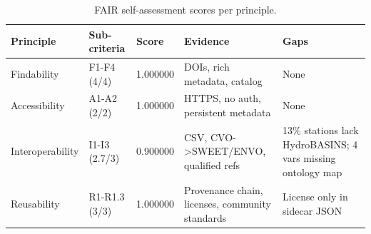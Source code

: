 \begin{table}
\caption{FAIR self-assessment scores per principle.}
\label{tab:fair}
\begin{tabular}{lllll}
\toprule
Principle & Sub-criteria & Score & Evidence & Gaps \\
\midrule
Findability & F1-F4 (4/4) & 1.000000 & DOIs, rich metadata, catalog & None \\
Accessibility & A1-A2 (2/2) & 1.000000 & HTTPS, no auth, persistent metadata & None \\
Interoperability & I1-I3 (2.7/3) & 0.900000 & CSV, CVO->SWEET/ENVO, qualified refs & 13\% stations lack HydroBASINS; 4 vars missing ontology map \\
Reusability & R1-R1.3 (3/3) & 1.000000 & Provenance chain, licenses, community standards & License only in sidecar JSON \\
\bottomrule
\end{tabular}
\end{table}
